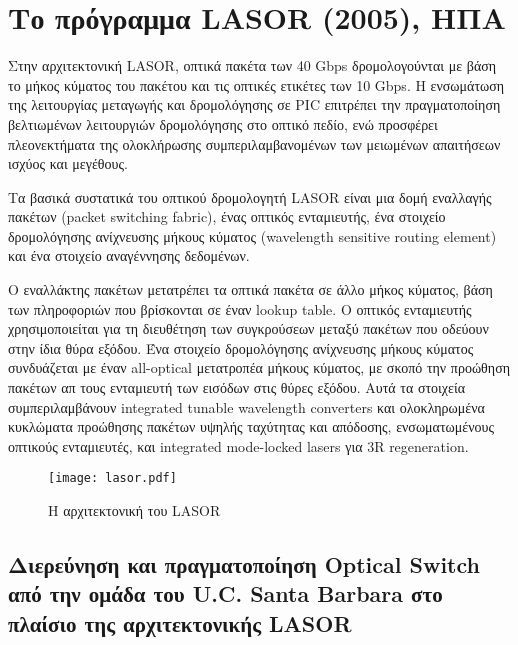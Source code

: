 ﻿
\section{Το πρόγραμμα LASOR (2005), ΗΠΑ}

Στην αρχιτεκτονική LASOR, οπτικά πακέτα των 40 Gbps δρομολογούνται με
βάση το μήκος κύματος του πακέτου και τις οπτικές ετικέτες των 10
Gbps. Η ενσωμάτωση της λειτουργίας μεταγωγής και δρομολόγησης σε PIC
επιτρέπει την πραγματοποίηση βελτιωμένων λειτουργιών δρομολόγησης στο
οπτικό πεδίο, ενώ προσφέρει πλεονεκτήματα της ολοκλήρωσης
συμπεριλαμβανομένων των μειωμένων απαιτήσεων ισχύος και μεγέθους.

Τα βασικά συστατικά του οπτικού δρομολογητή LASΟR \cite{1584172} είναι
μια δομή εναλλαγής πακέτων (packet switching fabric), ένας οπτικός
ενταμιευτής, ένα στοιχείο δρομολόγησης ανίχνευσης μήκους κύματος
(wavelength sensitive routing element) και ένα στοιχείο αναγέννησης
δεδομένων.

Ο εναλλάκτης πακέτων μετατρέπει τα οπτικά πακέτα σε άλλο μήκος
κύματος, βάση των πληροφοριών που βρίσκονται σε έναν lookup table. Ο
οπτικός ενταμιευτής χρησιμοποιείται για τη διευθέτηση των συγκρούσεων
μεταξύ πακέτων που οδεύουν στην ίδια θύρα εξόδου. Ένα στοιχείο
δρομολόγησης ανίχνευσης μήκους κύματος συνδυάζεται με έναν all-optical
μετατροπέα μήκους κύματος, με σκοπό την προώθηση πακέτων απ τους
ενταμιευτή των εισόδων στις θύρες εξόδου. Αυτά τα στοιχεία
συμπεριλαμβάνουν integrated tunable wavelength converters και
ολοκληρωμένα κυκλώματα προώθησης πακέτων υψηλής ταχύτητας και
απόδοσης, ενσωματωμένους οπτικούς ενταμιευτές, και integrated 
mode-locked lasers για 3R regeneration.

\begin{figure}[h]
  \centering
  \texttt{[image: lasor.pdf]}
  \caption{Η αρχιτεκτονική του LASOR}
  \label{fig:lasor}
\end{figure}

\subsection{Διερεύνηση και πραγματοποίηση Optical Switch από την ομάδα του U.C.
Santa Barbara στο πλαίσιο της αρχιτεκτονικής LASOR}

